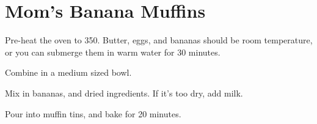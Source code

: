 \section{Mom's Banana Muffins}
\begin{recipe}


Pre-heat the oven to 350\degree{}. 
Butter, eggs, and bananas should be room temperature, or you
can submerge them in warm water for 30 minutes. 


Combine in a medium sized bowl.


Mix in bananas, and dried ingredients. If it's 
too dry, add milk. 

Pour into muffin tins, and bake for 20 minutes. 

\end{recipe}
